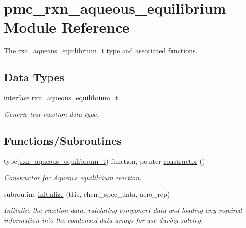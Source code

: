 \hypertarget{namespacepmc__rxn__aqueous__equilibrium}{}\section{pmc\+\_\+rxn\+\_\+aqueous\+\_\+equilibrium Module Reference}
\label{namespacepmc__rxn__aqueous__equilibrium}


The \mbox{\hyperlink{structpmc__rxn__aqueous__equilibrium_1_1rxn__aqueous__equilibrium__t}{rxn\+\_\+aqueous\+\_\+equilibrium\+\_\+t}} type and associated functions.  


\subsection*{Data Types}
\begin{DoxyCompactItemize}
\item 
interface \mbox{\hyperlink{structpmc__rxn__aqueous__equilibrium_1_1rxn__aqueous__equilibrium__t}{rxn\+\_\+aqueous\+\_\+equilibrium\+\_\+t}}
\begin{DoxyCompactList}\small\item\em Generic test reaction data type. \end{DoxyCompactList}\end{DoxyCompactItemize}
\subsection*{Functions/\+Subroutines}
\begin{DoxyCompactItemize}
\item 
type(\mbox{\hyperlink{structpmc__rxn__aqueous__equilibrium_1_1rxn__aqueous__equilibrium__t}{rxn\+\_\+aqueous\+\_\+equilibrium\+\_\+t}}) function, pointer \mbox{\hyperlink{namespacepmc__rxn__aqueous__equilibrium_ae6c5b3259b8d34ae01cf59fb68e950a2}{constructor}} ()
\begin{DoxyCompactList}\small\item\em Constructor for Aqueous equilibrium reaction. \end{DoxyCompactList}\item 
subroutine \mbox{\hyperlink{namespacepmc__rxn__aqueous__equilibrium_a1563a3411636e56a81e0915d45085e45}{initialize}} (this, chem\+\_\+spec\+\_\+data, aero\+\_\+rep)
\begin{DoxyCompactList}\small\item\em Initialize the reaction data, validating component data and loading any required information into the condensed data arrays for use during solving. \end{DoxyCompactList}\end{DoxyCompactItemize}


